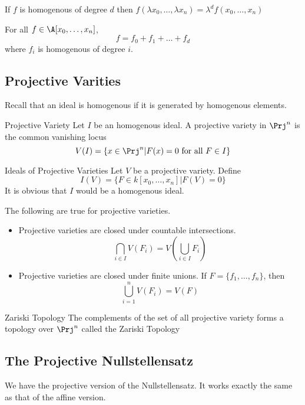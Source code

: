 \documentclass[a4paper]{article}
\begin{document}
\begin{lmm}{}{} If $f$ is homogenous of degree $d$ then $f(\lambda x_0,\dots,\lambda x_n)=\lambda^df(x_0,\dots,x_n)$
\end{lmm}

\begin{lmm}{}{} For all $f\in\A[x_0,\dots,x_n]$, $$f=f_0+f_1+\dots+f_d$$ where $f_i$ is homogenous of degree $i$. 
\end{lmm}

\subsection{Projective Varities}
Recall that an ideal is homogenous if it is generated by homogenous elements. 

\begin{defn}{Projective Variety}{} Let $I$ be an homogenous ideal. A projective variety in $\Prj^n$ is the common vanishing locus $$V(I)=\{x\in\Prj^n|F(x)=0\text{ for all }F\in I\}$$ 
\end{defn}

\begin{defn}{Ideals of Projective Varieties}{} Let $V$ be a projective variety. Define $$I(V)=\{F\in k[x_0,\dots,x_n]|F(V)=0\}$$ It is obvious that $I$ would be a homogenous ideal. 
\end{defn}

\begin{prp}{}{} The following are true for projective varieties. 
\begin{itemize}
\item Projective varieties are closed under countable intersections. $$\bigcap_{i\in I}V(F_i)=V\left(\bigcup_{i\in I}F_i\right)$$
\item Projective varieties are closed under finite unions. If $F=\{f_1,\dots,f_n\}$, then $$\bigcup_{i=1}^nV(F_i)=V(F)$$
\end{itemize}
\end{prp}

\begin{crl}{Zariski Topology}{} The complements of the set of all projective variety forms a topology over $\Prj^n$ called the Zariski Topology
\end{crl}

\subsection{The Projective Nullstellensatz}
We have the projective version of the Nullstellensatz. It works exactly the same as that of the affine version. 
\end{document}
